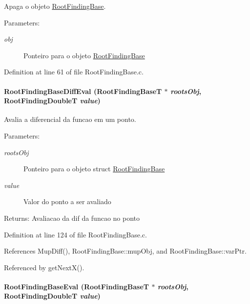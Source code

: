 Apaga o objeto \hyperlink{structRootFindingBase}{RootFindingBase}. 

\begin{Desc}
\item[Parameters:]
\begin{description}
\item[{\em obj}]Ponteiro para o objeto \hyperlink{structRootFindingBase}{RootFindingBase} \end{description}
\end{Desc}


Definition at line 61 of file RootFindingBase.c.\hypertarget{group____roots_g4971f377f5d7fdf4d2a55ed324955f09}{
\paragraph[RootFindingBaseDiffEval]{ RootFindingBaseDiffEval ({\bf RootFindingBaseT} $\ast$ {\em rootsObj}, \/  {\bf RootFindingDoubleT} {\em value})}\hfill}
\label{group____roots_g4971f377f5d7fdf4d2a55ed324955f09}


Avalia a diferencial da funcao em um ponto. 

\begin{Desc}
\item[Parameters:]
\begin{description}
\item[{\em rootsObj}]Ponteiro para o objeto struct \hyperlink{structRootFindingBase}{RootFindingBase} \item[{\em value}]Valor do ponto a ser avaliado \end{description}
\end{Desc}
\begin{Desc}
\item[Returns:]Avaliacao da dif da funcao no ponto \end{Desc}


Definition at line 124 of file RootFindingBase.c.

References MupDiff(), RootFindingBase::mupObj, and RootFindingBase::varPtr.

Referenced by getNextX().\hypertarget{group____roots_g5d64bcdb5cde64f2e5c757f74e82d336}{
\paragraph[RootFindingBaseEval]{ RootFindingBaseEval ({\bf RootFindingBaseT} $\ast$ {\em rootsObj}, \/  {\bf RootFindingDoubleT} {\em value})}\hfill}
\label{group____roots_g5d64bcdb5cde64f2e5c757f74e82d336}


